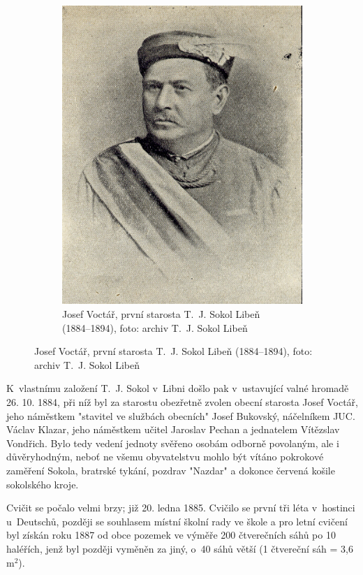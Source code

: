 \documentclass[a5paper, 11pt, twoside]{article}
\begin{document}
\begin{figure}[h]
\begin{subfigure}[c]{0.5\textwidth}
   \includegraphics[width=\textwidth]{img/04_voctar.jpg}
  \caption*{Josef Voctář, první starosta T.~J. Sokol Libeň (1884–⁠⁠⁠⁠⁠⁠1894), foto: archiv T.~J. Sokol Libeň }
  \end{subfigure}
\end{figure}

K~vlastnímu založení T.~J. Sokol v~Libni došlo pak v~ustavující valné hromadě 26. 10. 1884, při níž byl za starostu obezřetně zvolen obecní starosta Josef Voctář, jeho náměstkem "stavitel ve službách obecních" Josef Bukovský, náčelníkem JUC. Václav Klazar, jeho náměstkem učitel Jaroslav Pechan a jednatelem Vítězslav Vondřich. Bylo tedy vedení jednoty svěřeno osobám odborně povolaným, ale i důvěryhodným, neboť ne všemu obyvatelstvu mohlo být vítáno pokrokové zaměření Sokola, bratrské tykání, pozdrav "Nazdar" a dokonce červená košile sokolského kroje.

Cvičit se počalo velmi brzy; již 20. ledna 1885. Cvičilo se první tři léta v~hostinci u~Deutschů, později se souhlasem místní školní rady ve škole a pro letní cvičení byl získán roku 1887 od obce pozemek ve výměře 200 čtverečních sáhů po 10 haléřích, jenž byl později vyměněn za jiný, o~40 sáhů větší (1 čtvereční sáh = 3,6\,$\textrm{m}^2$).
\end{document}
